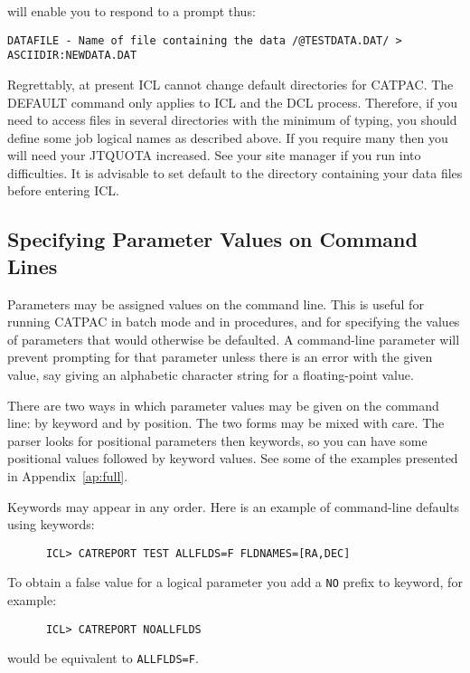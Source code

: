 will enable you to respond to a prompt thus:

\begin{small}
\begin{verbatim}
DATAFILE - Name of file containing the data /@TESTDATA.DAT/ > ASCIIDIR:NEWDATA.DAT
\end{verbatim}
\end{small}

Regrettably, at present {\small ICL} cannot change default directories
for {\small CATPAC}.  The DEFAULT command only applies to {\small ICL}
and the {\small DCL} process.  Therefore, if you need to access files in
several directories with the minimum of typing, you should define some
job logical names as described above.  If you require many then you will
need your JTQUOTA increased.  See your site manager if you run into
difficulties.  It is advisable to set default to the directory
containing your data files before entering {\small ICL}.

\subsection{Specifying Parameter Values on Command Lines}
\label{se:cmdlindef}
Parameters may be assigned values on the command line. This is useful
for running {\small CATPAC} in batch mode and in procedures, and for
specifying the values of parameters that would otherwise be defaulted. A
command-line parameter will prevent prompting for that parameter unless
there is an error with the given value, say giving an alphabetic
character string for a floating-point value. 

There are two ways in which parameter values may be given on the
command line: by keyword and by position. The two forms may be
mixed with care. The parser looks for positional parameters then
keywords, so you can have some positional values followed by keyword
values.  See some of the examples presented in Appendix~\ref{ap:full}.

Keywords may appear in any order.
Here is an example of command-line defaults using keywords: 
\begin{verbatim}
      ICL> CATREPORT TEST ALLFLDS=F FLDNAMES=[RA,DEC]
\end{verbatim}

To obtain a false value for a logical parameter
you add a {\tt NO} prefix to keyword, for example:
\begin{verbatim}
      ICL> CATREPORT NOALLFLDS
\end{verbatim}
would be equivalent to {\tt ALLFLDS=F}.

